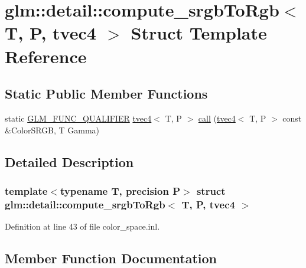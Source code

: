 \hypertarget{structglm_1_1detail_1_1compute__srgb_to_rgb_3_01_t_00_01_p_00_01tvec4_01_4}{}\section{glm\+::detail\+::compute\+\_\+srgb\+To\+Rgb$<$ T, P, tvec4 $>$ Struct Template Reference}
\label{structglm_1_1detail_1_1compute__srgb_to_rgb_3_01_t_00_01_p_00_01tvec4_01_4}
\subsection*{Static Public Member Functions}
\begin{DoxyCompactItemize}
\item 
static \mbox{\hyperlink{setup_8hpp_a33fdea6f91c5f834105f7415e2a64407}{G\+L\+M\+\_\+\+F\+U\+N\+C\+\_\+\+Q\+U\+A\+L\+I\+F\+I\+ER}} \mbox{\hyperlink{structglm_1_1tvec4}{tvec4}}$<$ T, P $>$ \mbox{\hyperlink{structglm_1_1detail_1_1compute__srgb_to_rgb_3_01_t_00_01_p_00_01tvec4_01_4_a09238f9fb7bdd410512b3daf66ecabbc}{call}} (\mbox{\hyperlink{structglm_1_1tvec4}{tvec4}}$<$ T, P $>$ const \&Color\+S\+R\+GB, T Gamma)
\end{DoxyCompactItemize}


\subsection{Detailed Description}
\subsubsection*{template$<$typename T, precision P$>$\newline
struct glm\+::detail\+::compute\+\_\+srgb\+To\+Rgb$<$ T, P, tvec4 $>$}



Definition at line 43 of file color\+\_\+space.\+inl.



\subsection{Member Function Documentation}
\mbox{\label{structglm_1_1detail_1_1compute__srgb_to_rgb_3_01_t_00_01_p_00_01tvec4_01_4_a09238f9fb7bdd410512b3daf66ecabbc}} 
